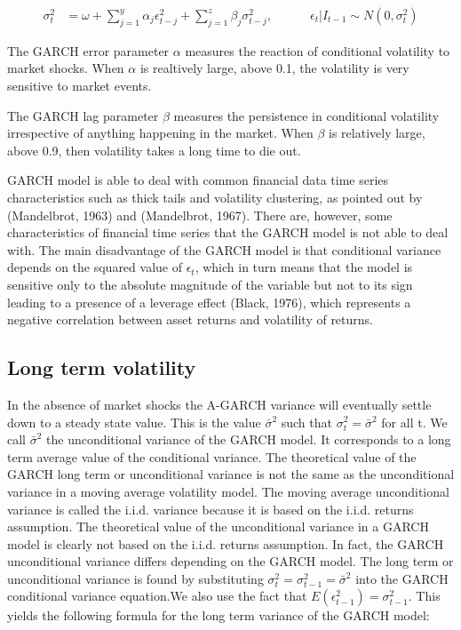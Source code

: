 \begin{align}
    \sigma_t^2 &= \omega + \sum_{j=1}^y\alpha_j\epsilon_{t-j}^2+\sum_{j=1}^z\beta_j\sigma_{t-j}^2,\quad\quad\quad \epsilon_t | I_{t-1} \sim N(0,{\sigma_t^2}) \label{ConditionalVolatilityEquation}
\end{align}

The GARCH error parameter $\alpha$ measures the reaction of conditional volatility to market shocks. When $\alpha$ is realtively large, above 0.1, the volatility is very sensitive to market events.

The GARCH lag parameter $\beta$ measures the persistence in conditional volatility irrespective of anything happening in the market. When $\beta$ is relatively large, above 0.9, then volatility takes a long time to die out.

GARCH model is able to deal with common financial data time series characteristics such as thick tails and volatility clustering, as pointed out by (Mandelbrot, 1963) and (Mandelbrot, 1967). There are, however, some characteristics of financial time series that the GARCH model is not able to deal with. The main disadvantage of the GARCH model is that conditional variance depends on the squared value of $\epsilon_t$, which in turn means that the model is sensitive only to the absolute magnitude of the variable but not to its sign leading to a presence of a leverage effect (Black, 1976), which represents a negative
correlation between asset returns and volatility of returns.

\subsection*{Long term volatility}

In the absence of market shocks the A-GARCH variance will eventually settle down to a steady state value. This is the value $\bar{\sigma}^2$ such that ${\sigma_t^2} = \bar{\sigma}^2$ for all t. We call $\bar{\sigma}^2$ the unconditional variance of the GARCH model. It corresponds to a long term average value of the conditional variance. The theoretical value of the GARCH long term or unconditional variance is not the same as the unconditional variance in a moving average volatility model. The moving average unconditional variance is called the i.i.d. variance because it is based on the i.i.d. returns assumption. The theoretical value of the unconditional variance in a GARCH model is clearly not based on the i.i.d. returns assumption. In fact, the GARCH unconditional variance differs depending on the GARCH model. The long term or unconditional variance is found by substituting ${\sigma_t^2} = {\sigma_{t-1}^2} = \bar{\sigma}^2$ into the GARCH conditional variance equation.We also use the fact that $E(\epsilon_{t-1}^2)=\sigma_{t-1}^2$. This yields the following formula for the long term variance of the GARCH model:

